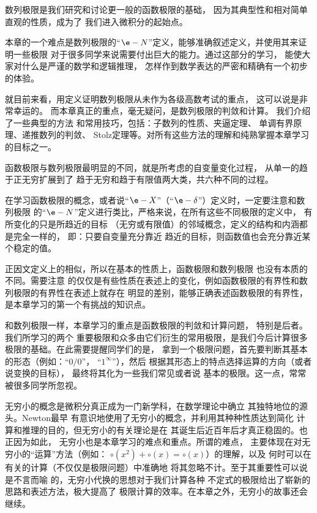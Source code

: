 数列极限是我们研究和讨论更一般的函数极限的基础，
因为其典型性和相对简单直观的性质，成为了
我们进入微积分的起始点。

本章的一个难点是{\kaishu 数列极限的“$\e-N$”定义}，能够准确叙述定义，并使用其来证明一些极限
对于很多同学来说需要付出巨大的能力。通过这部分的学习，
能使大家对什么是严谨的数学和逻辑推理，
怎样作到数学表达的严密和精确有一个初步的体验。

就目前来看，用定义证明数列极限从未作为各级高数考试的重点，
这可以说是非常幸运的。
而本章真正的重点，毫无疑问，是数列极限的判敛和计算。
我们介绍了一些典型的方法
和常用技巧，包括：{\kaishu 子数列的性质、夹逼定理、
单调有界原理、递推数列的判敛、
Stolz定理等}。对所有这些方法的理解和纯熟掌握本章学习的目标之一。

函数极限与数列极限最明显的不同，就是所考虑的自变量变化过程，
从单一的趋于正无穷扩展到了
趋于无穷和趋于有限值两大类，共六种不同的过程。

在学习函数极限的概念，或者说“$\e-X$”（“$\e-\delta$”）定义时，一定要注意和数列极限
的“$\e-N$”定义进行类比，严格来说，在所有这些不同极限的定义中，
有所变化的只是所趋近的目标
（无穷或有限值）的邻域概念，定义的结构和内涵都是完全一样的，
即：{\kaishu 只要自变量充分靠近
趋近的目标，则函数值也会充分靠近某个稳定的值。}

正因文定义上的相似，所以在基本的性质上，函数极限和数列极限
也没有本质的不同。需要注意
的仅仅是有些性质在表述上的变化，例如{\kaishu 函数极限的有界性}和数列极限的有界性在表述上就存在
明显的差别，能够正确表述函数极限的有界性，
是本章学习的第一个有挑战的知识点。

和数列极限一样，本章学习的重点是函数极限的判敛和计算问题，
特别是后者。我们所学习的{\kaishu 两个
重要极限和众多由它们衍生的常用极限}，是我们今后计算很多极限的基础。在此需要提醒同学们的是，
拿到一个极限问题，首先要判断其基本的形态（例如：“$0/0$”，
“$1^{\infty}$”），然后
根据其形态上的特点选择运算的方向（或者说变换的目标），
最终将其化为一些我们常见或者说
基本的极限。这一点，常常被很多同学所忽视。

无穷小的概念是微积分真正成为一门新学科，在数学理论中确立
其独特地位的源头。Newton最早
有意识地使用了无穷小的概念，并利用其种种性质达到简化
计算和推理的目的，但无穷小的有关理论是在
其诞生后近百年后才真正稳固的。也正因为如此，
无穷小也是本章学习的难点和重点。所谓的难点，
主要体现在对无穷小的“运算”方法（例如：
$\circ(x^2)+\circ(x)=\circ(x)$）的理解，以及
何时可以在有关的计算（不仅仅是极限问题）中准确地
将其忽略不计。至于其重要性可以说是不言而喻
的，{\kaishu 无穷小代换}的思想对于我们计算各种
不定式的极限给出了崭新的
思路和表述方法，极大提高了
极限计算的效率。在本章之外，无穷小的故事还会继续。

